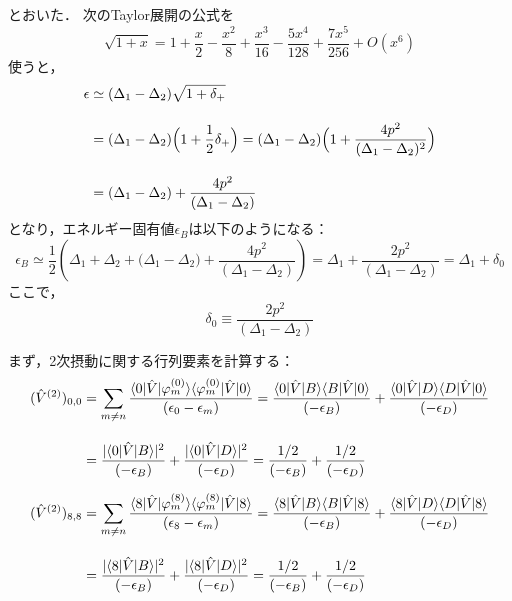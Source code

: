 とおいた．
次のTaylor展開の公式を
\begin{equation}
    \sqrt{1+x}
    =1+\frac{x}{2}-\frac{x^2}{8}+\frac{x^3}{16}-\frac{5x^4}{128}+\frac{7x^5}{256}+O\left(x^6\right)
\end{equation}
使うと，
\begin{align}
    \epsilon
    &\simeq{(\Delta_{1}}-{\Delta_{2}})
    \sqrt{1+\delta_{+}}\nn[10pt]
    &={(\Delta_{1}}-{\Delta_{2}})
    \Bigl(1+\frac{1}{2}\delta_{+}\Bigr)
    ={(\Delta_{1}}-{\Delta_{2}})
    \Bigl(1+\frac{4p^2}{(\Delta_{1}-\Delta_{2})^2}\Bigr)\nn[10pt]
    &={(\Delta_{1}}-{\Delta_{2}})
    +\frac{4p^2}{(\Delta_{1}-\Delta_{2})}
\end{align}
となり，エネルギー固有値$\epsilon_B$は以下のようになる：
\begin{equation}
    \epsilon_B
    \simeq\frac{1}{2}\left({\Delta_{1}}
    +{\Delta_{2}}+{(\Delta_{1}}-{\Delta_{2}})
    +\frac{4p^2}{(\Delta_{1}-\Delta_{2})}\right)
    =\Delta_1 + \frac{2p^2}{(\Delta_{1}-\Delta_{2})}
    =\Delta_1 + \delta_0
\end{equation}
ここで，
\begin{equation}
    \delta_0 \equiv \frac{2p^2}{(\Delta_{1}-\Delta_{2})}
\end{equation}

まず，2次摂動に関する行列要素を計算する：
\begin{align}
    (\hat{V}^{(2)})_{0,0}
    &=\sum_{m\neq n}
    \frac{\langle{0|\hat{V}|\varphi^{(0)}_m}\rangle
    \langle{\varphi^{(0)}_{m}|\hat{V}|0}\rangle}
    {(\epsilon_0-\epsilon_m)}
    =
    \frac{\langle{0|\hat{V}|B}\rangle
    \langle{B|\hat{V}|0}\rangle}
    {(-\epsilon_B)}
    +\frac{\langle{0|\hat{V}|D}\rangle
    \langle{D|\hat{V}|0}\rangle}
    {(-\epsilon_D)}\nn[10pt]
    &=\frac{|\langle{0|\hat{V}|B}\rangle|^2}
    {(-\epsilon_B)}
    +\frac{|\langle{0|\hat{V}|D}\rangle|^2}
    {(-\epsilon_D)}
    =\frac{1 / 2}
    {(-\epsilon_B)}
    +\frac{1 / 2}
    {(-\epsilon_D)}
\end{align}


\begin{align}
    (\hat{V}^{(2)})_{8,8}
    &=\sum_{m\neq n}
    \frac{\langle{8|\hat{V}|\varphi^{(8)}_m}\rangle
    \langle{\varphi^{(8)}_{m}|\hat{V}|8}\rangle}
    {(\epsilon_8-\epsilon_m)}
    =
    \frac{\langle{8|\hat{V}|B}\rangle
    \langle{B|\hat{V}|8}\rangle}
    {(-\epsilon_B)}
    +\frac{\langle{8|\hat{V}|D}\rangle
    \langle{D|\hat{V}|8}\rangle}
    {(-\epsilon_D)}\nn[10pt]
    &=\frac{|\langle{8|\hat{V}|B}\rangle|^2}
    {(-\epsilon_B)}
    +\frac{|\langle{8|\hat{V}|D}\rangle|^2}
    {(-\epsilon_D)}
    =\frac{1 / 2}
    {(-\epsilon_B)}
    +\frac{1 / 2}
    {(-\epsilon_D)}
\end{align}




